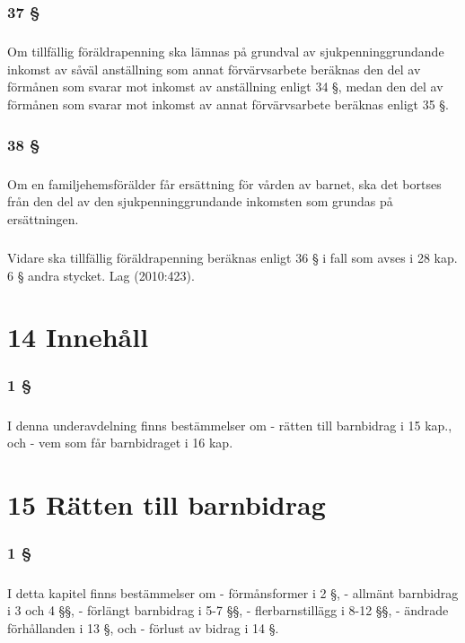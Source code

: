 \documentclass[a4paper,notitlepage,openany,10pt]{book}
\begin{document}
\subsection*{37 §}
\paragraph*{}
Om tillfällig föräldrapenning ska lämnas på grundval av sjukpenninggrundande inkomst av såväl anställning som annat förvärvsarbete beräknas den del av förmånen som svarar mot inkomst av anställning enligt 34 §, medan den del av förmånen som svarar mot inkomst av annat förvärvsarbete beräknas enligt 35 §.
\subsection*{38 §}
\paragraph*{}
Om en familjehemsförälder får ersättning för vården av barnet, ska det bortses från den del av den sjukpenninggrundande inkomsten som grundas på ersättningen.
\paragraph*{}
Vidare ska tillfällig föräldrapenning beräknas enligt 36 § i fall som avses i 28 kap. 6 § andra stycket.
Lag (2010:423).
\chapter*{14 Innehåll}
\subsection*{1 §}
\paragraph*{}
I denna underavdelning finns bestämmelser om
\newline - rätten till barnbidrag i 15 kap., och
\newline - vem som får barnbidraget i 16 kap.
\chapter*{15 Rätten till barnbidrag}
\subsection*{1 §}
\paragraph*{}
I detta kapitel finns bestämmelser om
\newline - förmånsformer i 2 §,
\newline - allmänt barnbidrag i 3 och 4 §§,
\newline - förlängt barnbidrag i 5-7 §§,
\newline - flerbarnstillägg i 8-12 §§,
\newline - ändrade förhållanden i 13 §, och
\newline - förlust av bidrag i 14 §.
\end{document}
